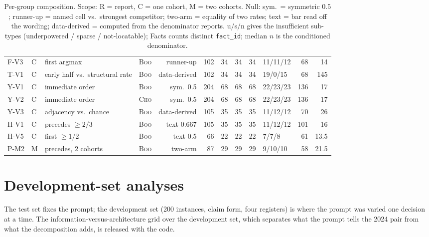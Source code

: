 \begin{table}[tp]
\begin{tabular}{llllrrrrrlrr}
F-V3 & C & first argmax & \textsc{Boo} & runner-up & 102 & 34 & 34 & 34 & 11/11/12 & 68 & 14 \\
T-V1 & C & early half vs.\ structural rate & \textsc{Boo} & data-derived & 102 & 34 & 34 & 34 & 19/0/15 & 68 & 145 \\
Y-V1 & C & immediate order & \textsc{Boo} & sym.\ 0.5 & 204 & 68 & 68 & 68 & 22/23/23 & 136 & 17 \\
Y-V2 & C & immediate order & \textsc{Cho} & sym.\ 0.5 & 204 & 68 & 68 & 68 & 22/23/23 & 136 & 17 \\
Y-V3 & C & adjacency vs.\ chance & \textsc{Boo} & data-derived & 105 & 35 & 35 & 35 & 11/12/12 & 70 & 26 \\
H-V1 & C & precedes $\geq 2/3$ & \textsc{Boo} & text 0.667 & 105 & 35 & 35 & 35 & 11/12/12 & 101 & 16 \\
H-V5 & C & first $\geq 1/2$ & \textsc{Boo} & text 0.5 & 66 & 22 & 22 & 22 & 7/7/8 & 61 & 13.5 \\
\midrule
P-M2 & M & precedes, 2 cohorts & \textsc{Boo} & two-arm & 87 & 29 & 29 & 29 & 9/10/10 & 58 & 21.5 \\
\bottomrule
\end{tabular}
\caption{Per-group composition. Scope: R = report, C = one cohort, M = two
cohorts. Null: sym.\ = symmetric $0.5$; runner-up = named cell vs.\ strongest
competitor; two-arm = equality of two rates; text = bar read off the wording;
data-derived = computed from the denominator reports. u/s/n gives the
insufficient sub-types (underpowered / sparse / not-locatable); Facts counts
distinct \texttt{fact\_id}; median $n$ is the conditioned denominator.}
\label{tab:pergroup}
\end{table}


\fi

\iffalse  %
\section{Development-set analyses}
\label{app:dev}

The test set fixes the prompt; the development set (200 instances, claim
form, four registers) is where the prompt was varied one decision at a time.
The information-versus-architecture grid over the development set, which
separates what the prompt tells the 2024 pair from what the decomposition
adds, is released with the code.

\iffalse  %
